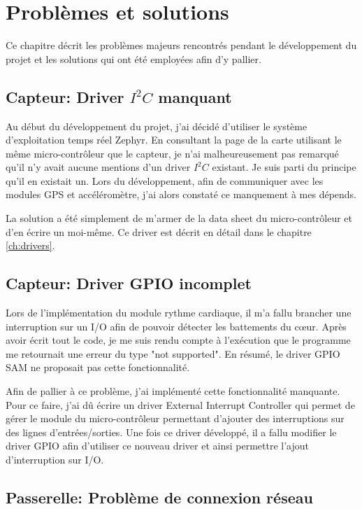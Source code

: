 
\chapter{Problèmes et solutions}\label{ch:prob_solutions}

Ce chapitre décrit les problèmes majeurs rencontrés pendant le développement du projet et les solutions qui ont été employées afin d'y pallier.

\section{Capteur: Driver $I^{2}C$ manquant}

Au début du développement du projet, j'ai décidé d'utiliser le système d'exploitation temps réel Zephyr. En consultant la page de la carte utilisant le même micro-contrôleur que le capteur, je n'ai malheureusement pas remarqué qu'il n'y avait aucune mentions d'un driver $I^{2}C$ existant. Je suis parti du principe qu'il en existait un. Lors du développement, afin de communiquer avec les modules GPS et accéléromètre, j'ai alors constaté ce manquement à mes dépends.

La solution a été simplement de m'armer de la data sheet du micro-contrôleur et d'en écrire un moi-même. Ce driver est décrit en détail dans le chapitre \ref{ch:drivers}.

\section{Capteur: Driver GPIO incomplet}

Lors de l'implémentation du module rythme cardiaque, il m'a fallu brancher une interruption sur un I/O afin de pouvoir détecter les battements du cœur. Après avoir écrit tout le code, je me suis rendu compte à l'exécution que le programme me retournait une erreur du type "not supported". En résumé, le driver GPIO SAM ne proposait pas cette fonctionnalité.

Afin de pallier à ce problème, j'ai implémenté cette fonctionnalité manquante. Pour ce faire, j'ai dû écrire un driver External Interrupt Controller qui permet de gérer le module du micro-contrôleur permettant d'ajouter des interruptions sur des lignes d'entrées/sorties. Une fois ce driver développé, il a fallu modifier le driver GPIO afin d’utiliser ce nouveau driver et ainsi permettre l'ajout d'interruption sur I/O.

\section{Passerelle: Problème de connexion réseau}

